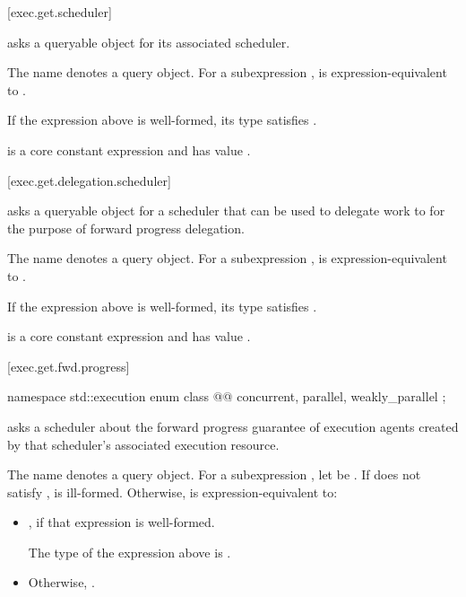 [exec.get.scheduler]{}

\pnum
{} asks a queryable object for its associated scheduler.

\pnum
The name  denotes a query object.
For a subexpression ,
 is expression-equivalent to
.

\mandates
If the expression above is well-formed,
its type satisfies .

\pnum
{} is
a core constant expression and has value .

[exec.get.delegation.scheduler]{}

\pnum
{} asks a queryable object for a scheduler
that can be used to delegate work to
for the purpose of forward progress delegation.

\pnum
The name  denotes a query object.
For a subexpression ,
 is expression-equivalent to
.

\mandates
If the expression above is well-formed,
its type satisfies .

\pnum
{} is
a core constant expression and has value .

[exec.get.fwd.progress]{}

\begin{codeblock}
namespace std::execution {
  enum class @@ {
    concurrent,
    parallel,
    weakly_parallel
  };
}
\end{codeblock}

\pnum
{} asks a scheduler about
the forward progress guarantee of execution agents
created by that scheduler's associated execution resource.

\pnum
The name  denotes a query object.
For a subexpression , let  be .
If  does not satisfy ,
 is ill-formed.
Otherwise,
 is expression-equivalent to:
\begin{itemize}
\item
{},
if that expression is well-formed.

\mandates
The type of the expression above is .
\item
Otherwise, .
\end{itemize}

